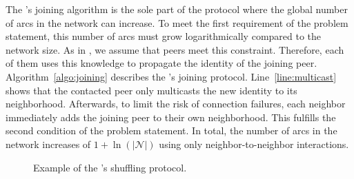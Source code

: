 
The \SPRAY's joining algorithm is the sole part of the protocol where the
global number of arcs in the network can increase. To meet the first
requirement of the problem statement, this number of arcs must grow
logarithmically compared to the network size. As in \SCAMP, we assume that
peers meet this constraint. Therefore, each of them uses this knowledge to
propagate the identity of the joining peer. Algorithm~\ref{algo:joining}
describes the \SPRAY's joining protocol. Line~\ref{line:multicast} shows that
the contacted peer only multicasts the new identity to its
neighborhood. Afterwards, to limit the risk of connection failures, each
neighbor immediately adds the joining peer to their own neighborhood. This
fulfills the second condition of the problem statement.  In total, the number
of arcs in the network increases of $1+\ln(|\mathcal{N}|)$ using only
neighbor-to-neighbor interactions.

\begin{figure*}
  \centering
  \hspace{10pt}
  \hspace{10pt}
  \caption{\label{fig:cyclicexample}Example of the \SPRAY's shuffling
    protocol. }
\end{figure*}

